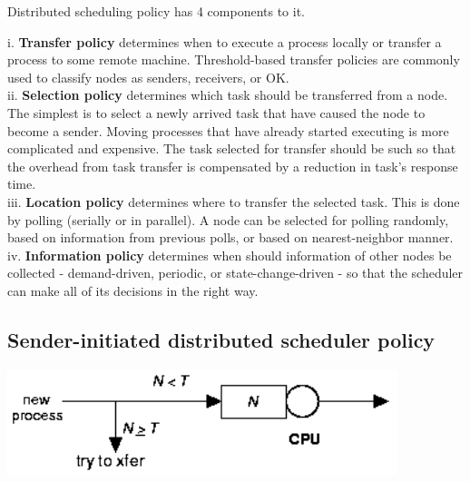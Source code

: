 \documentclass[twoside]{article}
\begin{document}
Distributed scheduling policy has 4 components to it.

i. {\bf Transfer policy} determines when to execute a process locally or transfer a process to some remote machine. Threshold-based transfer policies are commonly used to classify nodes as senders, receivers, or OK. \\

ii. {\bf Selection policy} determines which task should be transferred from a node. The simplest is to select a newly arrived task that have caused the node to become a sender. Moving processes that have already started executing is more complicated and expensive. The task selected for transfer should be such so that the overhead from task transfer is compensated by a reduction in task's response time.\\

iii. {\bf Location policy} determines where to transfer the selected task. This is done by polling
(serially or in parallel). A node can be selected for polling randomly, based on
information from previous polls, or based on nearest-neighbor manner. \\

iv. {\bf Information policy} determines when should information of other nodes be collected - demand-driven, periodic, or state-change-driven - so that the scheduler can make all of its decisions in the right way. \\

\subsection{Sender-initiated distributed scheduler policy}

\begin{center}
  \includegraphics[scale=1]{senderinitiated.png}\\
\end{center} 
\end{document}
